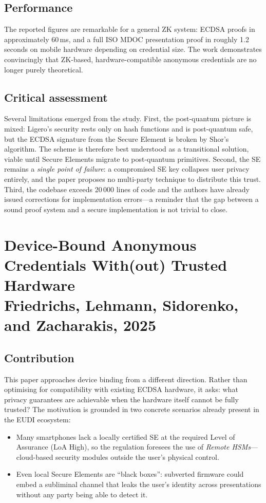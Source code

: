 \documentclass[11pt]{article}
\begin{document}
\subsection{Performance}

The reported figures are remarkable for a general ZK system: ECDSA proofs
in approximately 60\,ms, and a full ISO MDOC presentation proof in roughly
1.2\,seconds on mobile hardware depending on credential size. The work
demonstrates convincingly that ZK-based, hardware-compatible anonymous
credentials are no longer purely theoretical.

\subsection{Critical assessment}

Several limitations emerged from the study. First, the post-quantum picture
is mixed: Ligero's security rests only on hash functions and is post-quantum
safe, but the ECDSA signature from the Secure Element is broken by Shor's
algorithm. The scheme is therefore best understood as a transitional
solution, viable until Secure Elements migrate to post-quantum primitives.
Second, the SE remains a \emph{single point of failure}: a compromised SE key
collapses user privacy entirely, and the paper proposes no multi-party
technique to distribute this trust. Third, the codebase exceeds 20\,000
lines of code and the authors have already issued corrections for
implementation errors---a reminder that the gap between a sound proof system
and a secure implementation is not trivial to close.

\section{Device-Bound Anonymous Credentials With(out) Trusted Hardware\\
\small\normalfont Friedrichs, Lehmann, Sidorenko, and Zacharakis, 2025}

\subsection{Contribution}

This paper approaches device binding from a different direction. Rather than
optimising for compatibility with existing ECDSA hardware, it asks: what
privacy guarantees are achievable when the hardware itself cannot be fully
trusted? The motivation is grounded in two concrete scenarios already present
in the EUDI ecosystem:
\begin{itemize}
  \item Many smartphones lack a locally certified SE at the required Level
        of Assurance (LoA High), so the regulation foresees the use of
        \emph{Remote HSMs}---cloud-based security modules outside the user's
        physical control.
  \item Even local Secure Elements are ``black boxes'': subverted firmware
        could embed a subliminal channel that leaks the user's identity
        across presentations without any party being able to detect it.
\end{itemize}
\end{document}
